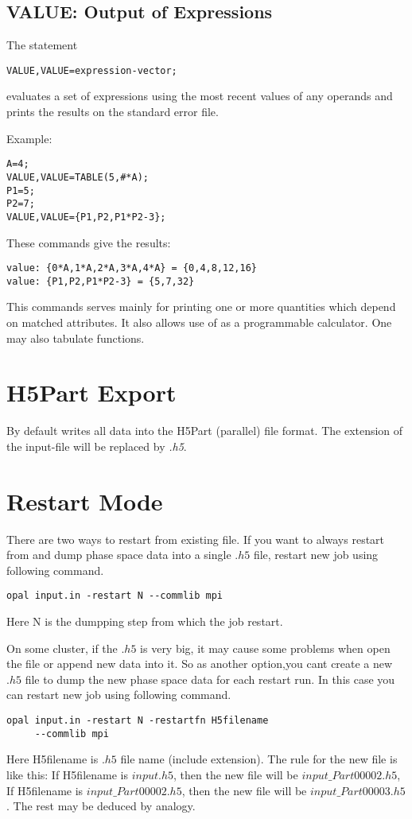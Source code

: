 \subsection{VALUE: Output of Expressions}
\label{sec:value}
The statement
\begin{verbatim}
VALUE,VALUE=expression-vector;
\end{verbatim}
evaluates a set of expressions using the most recent values of
any operands and prints the results on the standard error file.

\noindent Example:
\begin{verbatim}
A=4;
VALUE,VALUE=TABLE(5,#*A);
P1=5;
P2=7;
VALUE,VALUE={P1,P2,P1*P2-3};
\end{verbatim}
These commands give the results:
\begin{verbatim}
value: {0*A,1*A,2*A,3*A,4*A} = {0,4,8,12,16}
value: {P1,P2,P1*P2-3} = {5,7,32}
\end{verbatim}
This commands serves mainly for printing one or more quantities
which depend on matched attributes.
It also allows use of \opal as a programmable calculator.
One may also tabulate functions.


\section{H5Part Export}
\label{sec:h5partexport}
By default \opal writes all data into the H5Part (parallel) file format.
The extension of the input-file will be replaced by {\em .h5}.


\section{Restart Mode}
\label{sec:Restart}
There are two ways to restart from existing file. 
If you want to always restart from and dump phase space data into a single $.h5$ file, 
restart new job using following command.
\begin{verbatim}
opal input.in -restart N --commlib mpi
\end{verbatim}
Here N is the dumpping step from which the job restart.  

On some cluster, if the $.h5$ is very big, it may cause some problems when open the file or
append new data into it. So as another option,you cant create a new $.h5$ file to dump the 
new phase space data for each restart run. In this case you can restart new job using following command.  
\begin{verbatim}
opal input.in -restart N -restartfn H5filename 
     --commlib mpi
\end{verbatim}
Here H5filename is $.h5$ file name (include extension). The rule for the new file is like this:
If H5filename is $input.h5$, then the new file will be $input\_Part00002.h5$,
If H5filename is $input\_Part00002.h5$, then the new file will be $input\_Part00003.h5$.
The rest may be deduced by analogy.


